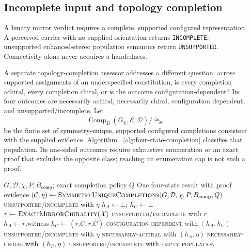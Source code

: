 \documentclass[pdflatex,sn-mathphys-num,referee,lineno]{sn-jnl}
\newcommand{\code}[1]{\texttt{#1}}
\theoremstyle{plain}
\theoremstyle{remark}
\theoremstyle{definition}
\begin{document}
\subsection{Incomplete input and topology completion}

A binary mirror verdict requires a complete, supported configured
representation.  A perceived carrier with no supplied orientation returns
\code{INCOMPLETE}; unsupported enhanced-stereo population semantics return
\code{UNSUPPORTED}.  Connectivity alone never acquires a handedness.

A separate topology-completion assessor addresses a different question:
across supported assignments of an underspecified constitution, is every
completion achiral, every completion chiral, or is the outcome
configuration-dependent?  Its four outcomes are necessarily achiral,
necessarily chiral, configuration dependent, and unsupported/incomplete.
Let
\[
  \operatorname{Comp}_{B}(G_\chi,\mathcal E,\mathcal D)/
  {\cong_{\mathrm{st}}}
\]
be the finite set of symmetry-unique, supported configured completions
consistent with the supplied evidence.  Algorithm~
\ref{alg:four-state-completion} classifies that population.  Its one-sided
outcomes require exhaustive enumeration or an exact proof that excludes the
opposite class; reaching an enumeration cap is not such a proof.

\begin{algorithm}[htbp]
\caption{Four-state classification of an underspecified constitution}
\label{alg:four-state-completion}
\begin{algorithmic}[1]
\Require \(G,\mathcal D,\chi,P,B_{\mathrm{comp}}\); exact completion policy \(Q\)
\Ensure One four-state result with proof evidence
\State \((\mathcal C,\eta)\gets
  \Call{SymmetryUniqueCompletions}{G,\mathcal D,\chi,P,B_{\mathrm{comp}},Q}\)
  \State \Return \textsc{unsupported/incomplete} with \(\eta\)
\EndIf
\State \(h_A\gets\bot;\ h_C\gets\bot\)
  \State \(r\gets\Call{ExactMirrorChirality}{\mathcal X}\)
    \State \Return \textsc{unsupported/incomplete} with \(r\)
    \State \(h_A\gets r.\mathrm{witness}\)
  \Else
    \State \(h_C\gets(r.C,r.\overline C)\)
  \EndIf
    \State \Return \textsc{configuration-dependent} with \((h_A,h_C)\)
  \EndIf
\EndFor
{}
  \State \Return \textsc{unsupported/incomplete} with \(\eta\)
\EndIf
{}
  \State \Return \textsc{necessarily-achiral} with \((h_A,\eta)\)
  \State \Return \textsc{necessarily-chiral} with \((h_C,\eta)\)
\Else
  \State \Return \textsc{unsupported/incomplete} with \textsc{empty population}
\EndIf
\end{algorithmic}
\end{algorithm}
\end{document}
